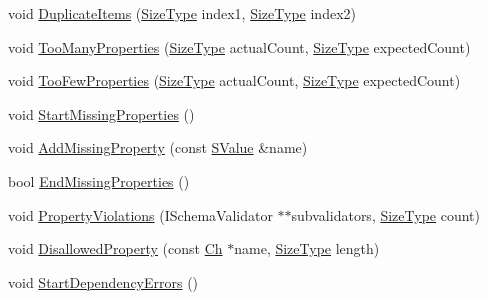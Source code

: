 \begin{DoxyCompactItemize}
\item 
void \mbox{\hyperlink{classrapidjson_1_1_generic_schema_validator_a7ad5d50a8df51dd51012bd3a525b0366}{Duplicate\+Items}} (\mbox{\hyperlink{namespacerapidjson_a44eb33eaa523e36d466b1ced64b85c84}{Size\+Type}} index1, \mbox{\hyperlink{namespacerapidjson_a44eb33eaa523e36d466b1ced64b85c84}{Size\+Type}} index2)
\item 
void \mbox{\hyperlink{classrapidjson_1_1_generic_schema_validator_acbaaa6d63ebdd11b8526fe4c7d6ba3cf}{Too\+Many\+Properties}} (\mbox{\hyperlink{namespacerapidjson_a44eb33eaa523e36d466b1ced64b85c84}{Size\+Type}} actual\+Count, \mbox{\hyperlink{namespacerapidjson_a44eb33eaa523e36d466b1ced64b85c84}{Size\+Type}} expected\+Count)
\item 
void \mbox{\hyperlink{classrapidjson_1_1_generic_schema_validator_aa7c129bc7d97e65c23e8d6733c331a9d}{Too\+Few\+Properties}} (\mbox{\hyperlink{namespacerapidjson_a44eb33eaa523e36d466b1ced64b85c84}{Size\+Type}} actual\+Count, \mbox{\hyperlink{namespacerapidjson_a44eb33eaa523e36d466b1ced64b85c84}{Size\+Type}} expected\+Count)
\item 
void \mbox{\hyperlink{classrapidjson_1_1_generic_schema_validator_ae2689c5db02a0f47bc986393c6a3f4ce}{Start\+Missing\+Properties}} ()
\item 
void \mbox{\hyperlink{classrapidjson_1_1_generic_schema_validator_acd199b291d3c02f7d3030c4b3e90a928}{Add\+Missing\+Property}} (const \mbox{\hyperlink{classrapidjson_1_1_generic_schema_validator_a545e4e19bd9419d908bc21e1a7a6170d}{S\+Value}} \&name)
\item 
bool \mbox{\hyperlink{classrapidjson_1_1_generic_schema_validator_a981efd4aab86914496aa4f6f5b343c41}{End\+Missing\+Properties}} ()
\item 
void \mbox{\hyperlink{classrapidjson_1_1_generic_schema_validator_a7d77aa3f5e4c266966e11b9eead3f0d2}{Property\+Violations}} (I\+Schema\+Validator $\ast$$\ast$subvalidators, \mbox{\hyperlink{namespacerapidjson_a44eb33eaa523e36d466b1ced64b85c84}{Size\+Type}} count)
\item 
void \mbox{\hyperlink{classrapidjson_1_1_generic_schema_validator_a531df83a842c2c1b1a1ffa935f5f0dbd}{Disallowed\+Property}} (const \mbox{\hyperlink{classrapidjson_1_1_generic_schema_validator_ab5b7093443e29cf66eb7cf47f3d8583d}{Ch}} $\ast$name, \mbox{\hyperlink{namespacerapidjson_a44eb33eaa523e36d466b1ced64b85c84}{Size\+Type}} length)
\item 
void \mbox{\hyperlink{classrapidjson_1_1_generic_schema_validator_a980ede674d2e3383266ce3f11e998ff2}{Start\+Dependency\+Errors}} ()
$$
\end{DoxyCompactItemize}
